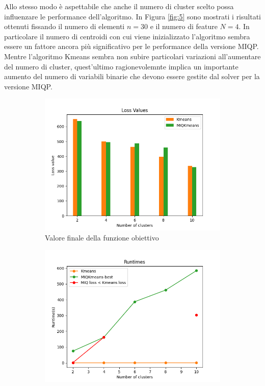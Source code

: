 \documentclass{article}
\begin{document}
    Allo stesso modo è aspettabile che anche il numero di cluster scelto possa influenzare le performance dell'algoritmo. In Figura \ref{fig:5} sono mostrati i risultati ottenuti fissando il numero di elementi $n=30$ e il numero di feature $N=4$. In particolare il numero di centroidi con cui viene inizializzato l'algoritmo sembra essere un fattore ancora più significativo per le performance della versione MIQP.
    Mentre l'algoritmo Kmeans sembra non subire particolari variazioni all'aumentare del numero di cluster, quest'ultimo ragionevolemnte implica un importante aumento del numero di variabili binarie che devono essere gestite dal solver per la versione MIQP.\\
    \begin{figure}[H]
     \centering
     \begin{subfigure}[t]{0.49\linewidth}
         \centering
         \includegraphics[width=\linewidth]{../results/plots/loss_centers_sint}
         \caption{Valore finale della funzione obiettivo}
     \end{subfigure}
     \hfill
     \begin{subfigure}[t]{0.49\linewidth}
         \centering
         \includegraphics[width=\linewidth]{../results/plots/runtime_centers_sint}

\end{subfigure}
\end{figure}
\end{document}
